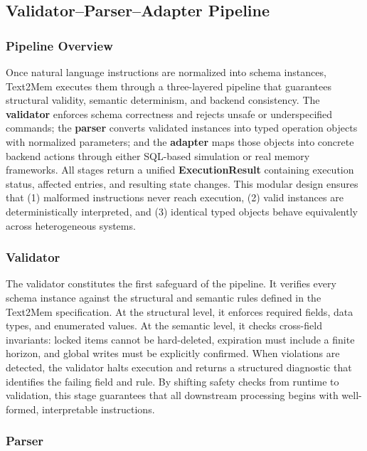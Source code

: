 \documentclass[conference]{IEEEtran}
\begin{document}
\subsection{Validator--Parser--Adapter Pipeline}
\label{subsec:pipeline}

\subsubsection{\textbf{Pipeline Overview}}
Once natural language instructions are normalized into schema instances, Text2Mem executes them through a three-layered pipeline that guarantees structural validity, semantic determinism, and backend consistency.  
The \textbf{validator} enforces schema correctness and rejects unsafe or underspecified commands; the \textbf{parser} converts validated instances into typed operation objects with normalized parameters; and the \textbf{adapter} maps those objects into concrete backend actions through either SQL-based simulation or real memory frameworks.  
All stages return a unified \textbf{ExecutionResult} containing execution status, affected entries, and resulting state changes.  
This modular design ensures that (1) malformed instructions never reach execution, (2) valid instances are deterministically interpreted, and (3) identical typed objects behave equivalently across heterogeneous systems.

\subsubsection{\textbf{Validator}}
The validator constitutes the first safeguard of the pipeline.  
It verifies every schema instance against the structural and semantic rules defined in the Text2Mem specification.  
At the structural level, it enforces required fields, data types, and enumerated values.  
At the semantic level, it checks cross-field invariants: locked items cannot be hard-deleted, expiration must include a finite horizon, and global writes must be explicitly confirmed.  
When violations are detected, the validator halts execution and returns a structured diagnostic that identifies the failing field and rule.  
By shifting safety checks from runtime to validation, this stage guarantees that all downstream processing begins with well-formed, interpretable instructions.

\subsubsection{\textbf{Parser}}
\end{document}
